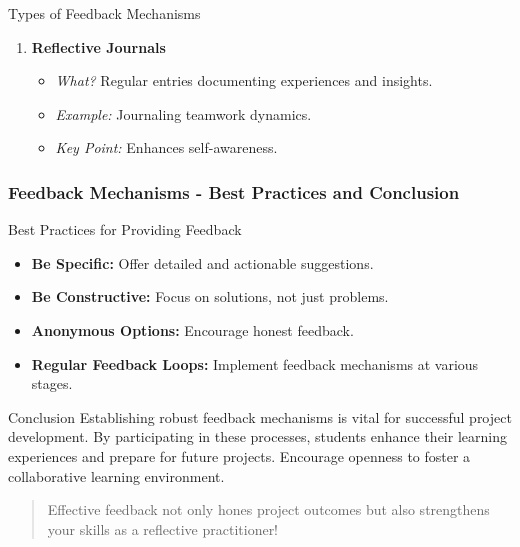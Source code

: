 \documentclass[aspectratio=169]{beamer}
\begin{document}
\begin{frame}[fragile]
\begin{block}{Types of Feedback Mechanisms}
\begin{enumerate}
            \item \textbf{Reflective Journals}
                \begin{itemize}
                    \item \textit{What?} Regular entries documenting experiences and insights.
                    \item \textit{Example:} Journaling teamwork dynamics.
                    \item \textit{Key Point:} Enhances self-awareness.
                \end{itemize}
        \end{enumerate}
    \end{block}
\end{frame}

\begin{frame}[fragile]
    \frametitle{Feedback Mechanisms - Best Practices and Conclusion}
    \begin{block}{Best Practices for Providing Feedback}
        \begin{itemize}
            \item \textbf{Be Specific:} Offer detailed and actionable suggestions.
            \item \textbf{Be Constructive:} Focus on solutions, not just problems.
            \item \textbf{Anonymous Options:} Encourage honest feedback.
            \item \textbf{Regular Feedback Loops:} Implement feedback mechanisms at various stages.
        \end{itemize}
    \end{block}

    \begin{block}{Conclusion}
        Establishing robust feedback mechanisms is vital for successful project development. By participating in these processes, students enhance their learning experiences and prepare for future projects. Encourage openness to foster a collaborative learning environment.
    \end{block}

    \begin{quote}
        Effective feedback not only hones project outcomes but also strengthens your skills as a reflective practitioner!
    \end{quote}
\end{frame}
\end{document}

